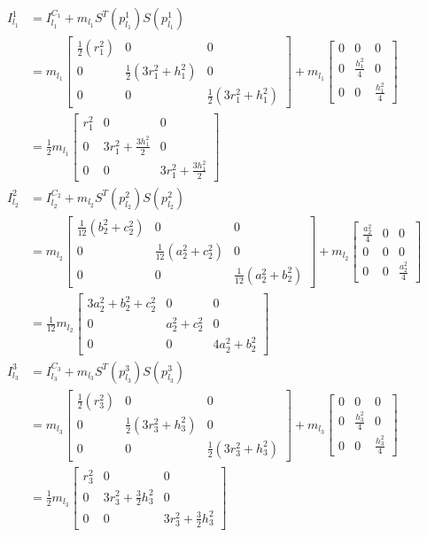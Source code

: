 \begin{align*}
I_{l_1}^1 &= I_{l_1}^{C_1}+m_{l_1}S^T(p_{l_1}^1)S(p_{l_1}^1)\\
&=m_{l_1}\begin{bmatrix}
\frac{1}{2}(r_1^2)&0&0\\
0&\frac{1}{2}(3r_1^2+h_1^2)&0\\
0&0&\frac{1}{2}(3r_1^2+h_1^2)
\end{bmatrix}+m_{l_1}\begin{bmatrix}
0&0&0\\0&\frac{h_1^2}{4}&0\\0&0&\frac{h_1^2}{4}
\end{bmatrix}\\&=\frac{1}{2}m_{l_1}\begin{bmatrix}
r_1^2&0&0\\
0&3r_1^2+\frac{3h_1^2}{2}&0\\
0&0&3r_1^2+\frac{3h_1^2}{2}
\end{bmatrix}\\
I_{l_2}^2 &= I_{l_2}^{C_2}+m_{l_2}S^T(p_{l_2}^2)S(p_{l_2}^2)\\
&=m_{l_2}\begin{bmatrix}
\frac{1}{12}(b_2^2+c_2^2)&0&0\\
0&\frac{1}{12}(a_2^2+c_2^2)&0\\
0&0&\frac{1}{12}(a_2^2+b_2^2)
\end{bmatrix}+m_{l_2}\begin{bmatrix}
\frac{a_2^2}{4}&0&0\\0&0&0\\0&0&\frac{a_2^2}{4}
\end{bmatrix}\\
&=\frac{1}{12}m_{l_2}\begin{bmatrix}
3a_2^2+b_2^2+c_2^2&0&0\\0&a_2^2+c_2^2&0\\0&0&4a_2^2+b_2^2
\end{bmatrix}\\
I_{l_3}^3 &= I_{l_3}^{C_3}+m_{l_3}S^T(p_{l_3}^3)S(p_{l_3}^3)\\
&=m_{l_3}\begin{bmatrix}
\frac{1}{2}(r_3^2)&0&0\\
0&\frac{1}{2}(3r_3^2+h_3^2)&0\\
0&0&\frac{1}{2}(3r_3^2+h_3^2)
\end{bmatrix}+m_{l_3}\begin{bmatrix}
0&0&0\\0&\frac{h_3^2}{4}&0\\0&0&\frac{h_3^2}{4}
\end{bmatrix}\\
&=\frac{1}{2}m_{l_3}\begin{bmatrix}
r_3^2&0&0\\
0&3r_3^2+\frac{3}{2}h_3^2&0\\
0&0&3r_3^2+\frac{3}{2}h_3^2
\end{bmatrix}
\end{align*}

